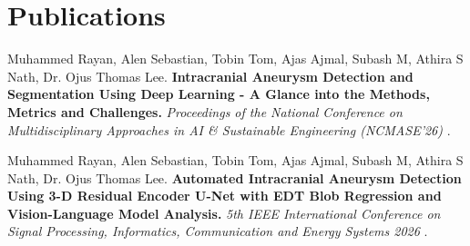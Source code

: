 \documentclass[twoside,a4paper,openright]{report} %
\begin{document}
\pagestyle{empty}

\chapter*{Publications}

\vspace{1cm}
\noindent [1] Muhammed Rayan, Alen Sebastian, 
Tobin Tom, Ajas Ajmal, Subash M, Athira S Nath,
 Dr. Ojus Thomas Lee. \textbf{Intracranial Aneurysm Detection and Segmentation Using Deep Learning - A Glance into the Methods, Metrics and Challenges.} \textit{Proceedings of the National Conference on Multidisciplinary Approaches in AI \& Sustainable Engineering (NCMASE'26)} .

\vspace{0.5cm}
\noindent [2] Muhammed Rayan, Alen Sebastian, 
Tobin Tom, Ajas Ajmal, Subash M, Athira S Nath,
 Dr. Ojus Thomas Lee. \textbf{Automated Intracranial Aneurysm Detection Using 3-D Residual Encoder U-Net with EDT Blob Regression and Vision-Language Model Analysis.} \textit{5th IEEE International Conference on Signal Processing, Informatics, Communication and Energy Systems 2026} .
\end{document}
